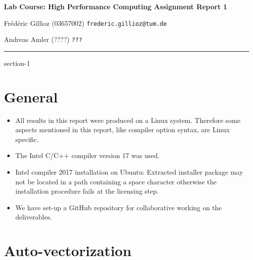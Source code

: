 \documentclass[11pt]{article}
\makeatletter
\newcommand{\hwhead}[4]{
\begin{center}
\sffamily\large\bfseries Lab Course: High Performance Computing Assignment Report #1
\vspace{2mm} 
\normalfont

#2

#3
\end{center}
\vspace{6mm} \hrule \vspace{4mm}
}
\newcommand{\namea}{Frédéric Gillioz (03657002) \texttt{frederic.gillioz@tum.de}}
\newcommand{\nameb}{Andreas Amler (????) \texttt{???}}
\makeatother
\begin{document}
\hwhead{1}{\namea}{\nameb}


\setcounter{section}{-1}
\section{General}

\begin{itemize}
\item All results in this report were produced on a Linux system. Therefore some aspects mentioned in this report, like compiler option syntax, are Linux specific.
\item The Intel C/C++ compiler version 17 was used.
\item Intel compiler 2017 installation on Ubuntu: Extracted installer package may not be located in a path containing a space character otherwise the installation procedure fails at the licensing step.
\item We have set-up a GitHub repository for collaborative working on the deliverables.
\end{itemize}

\section{Auto-vectorization}
\end{document}
